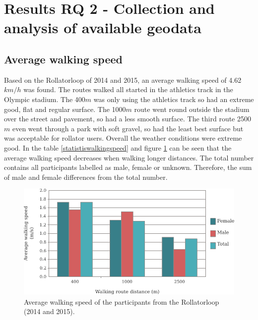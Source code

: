 

\section{Results RQ 2 - Collection and analysis of available geodata}\label{Rrq2a}

\subsection{Average walking speed}\label{Rrq1b}
Based on the Rollatorloop of 2014 and 2015, an average walking speed of 4.62$km/h$ was found. The routes walked all started in the athletics track in the Olympic stadium.
The 400$m$ was only using the athletics track so had an extreme good, flat and regular surface.
The 1000$m$ route went round outside the stadium over the street and pavement, so had a less smooth surface. The third route 2500$m$ even went through a park with soft gravel, so had the least best surface but was acceptable for rollator users. 
Overall the weather conditions were extreme good. 
In the table \ref{statistiswalkingspeed} and figure \ref{averagewalkingspeed} can be seen that the average walking speed decreases when walking longer distances. 
The total number contains all participants labelled as male, female or unknown. Therefore, the sum of male and female differences from the total number.

\begin{figure}[h]
\includegraphics[width=\textwidth]{img/R_averageWalkingSpeed.pdf}
\centering
\caption{Average walking speed of the participants from the Rollatorloop (2014 and 2015). \label{averagewalkingspeed}}
\end{figure}

